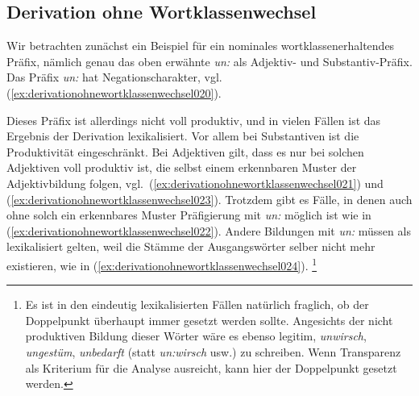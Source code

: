 \subsection{Derivation ohne Wortklassenwechsel}
\label{sec:derivationohnewortklassenwechsel}


Wir betrachten zunächst ein Beispiel für ein nominales wortklassenerhaltendes Präfix, nämlich genau das oben erwähnte \textit{un:} als Adjektiv- und Substantiv-Präfix.
Das Präfix \textit{un:} hat Negationscharakter, vgl. (\ref{ex:derivationohnewortklassenwechsel020}).

\begin{exe}
  \ex\label{ex:derivationohnewortklassenwechsel020}
  \begin{xlist}
  \end{xlist}
\end{exe}

Dieses Präfix ist allerdings nicht voll produktiv, und in vielen Fällen ist das Ergebnis der Derivation lexikalisiert.
Vor allem bei Substantiven ist die Produktivität eingeschränkt.
Bei Adjektiven gilt, dass es nur bei solchen Adjektiven voll produktiv ist, die selbst einem erkennbaren Muster der Adjektivbildung folgen, vgl.\ (\ref{ex:derivationohnewortklassenwechsel021}) und (\ref{ex:derivationohnewortklassenwechsel023}).
Trotzdem gibt es Fälle, in denen auch ohne solch ein erkennbares Muster Präfigierung mit \textit{un:} möglich ist wie in (\ref{ex:derivationohnewortklassenwechsel022}).
Andere Bildungen mit \textit{un:} müssen als lexikalisiert gelten, weil die Stämme der Ausgangswörter selber nicht mehr existieren, wie in (\ref{ex:derivationohnewortklassenwechsel024}).%
\footnote{Es ist in den eindeutig lexikalisierten Fällen natürlich fraglich, ob der Doppelpunkt überhaupt immer gesetzt werden sollte.
Angesichts der nicht produktiven Bildung dieser Wörter wäre es ebenso legitim, \textit{unwirsch}, \textit{ungestüm}, \textit{unbedarft} (statt \textit{un:wirsch} usw.) zu schreiben.
Wenn Transparenz als Kriterium für die Analyse ausreicht, kann hier der Doppelpunkt gesetzt werden.}

\begin{exe}
  \ex\label{ex:derivationohnewortklassenwechsel021}
    \begin{xlist}
  \end{xlist}
  \ex\label{ex:derivationohnewortklassenwechsel023}
  \begin{xlist}
  \end{xlist}
  \ex\label{ex:derivationohnewortklassenwechsel024}
  \begin{xlist}
  \end{xlist}
\end{exe}

